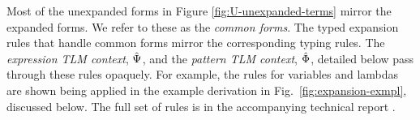 \documentclass[acmsmall,screen]{acmart}
\begin{document}



Most of the unexpanded forms in Figure \ref{fig:U-unexpanded-terms}  mirror the expanded forms. We refer to these as the \emph{common forms}. %
The typed expansion rules that handle common forms mirror the corresponding typing rules. The \emph{expression TLM context}, $\hat{\Psi}$, and the \emph{pattern TLM context}, $\hat\Phi$, detailed below pass through these rules opaquely. For example, the rules for variables and lambdas are shown being applied in the example derivation in Fig.~\ref{fig:expansion-exmpl}, discussed below. The full set of rules is in the accompanying technical report \cite{icfp18tr}.

\end{document}
